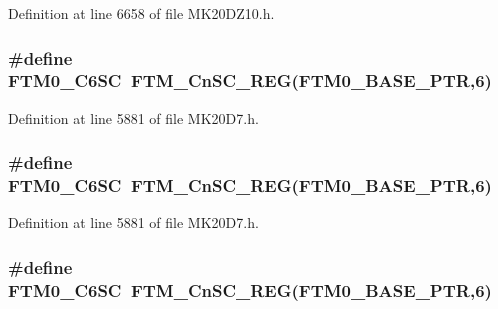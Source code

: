 Definition at line 6658 of file M\+K20\+D\+Z10.\+h.

\subsubsection[{\texorpdfstring{F\+T\+M0\+\_\+\+C6\+SC}{FTM0_C6SC}}]{\setlength{\rightskip}{0pt plus 5cm}\#define F\+T\+M0\+\_\+\+C6\+SC~{\bf F\+T\+M\+\_\+\+Cn\+S\+C\+\_\+\+R\+EG}({\bf F\+T\+M0\+\_\+\+B\+A\+S\+E\+\_\+\+P\+TR},6)}\hypertarget{group___f_t_m___register___accessor___macros_ga3396f58b1f7cc31a13bdee45a2ae783b}{}\label{group___f_t_m___register___accessor___macros_ga3396f58b1f7cc31a13bdee45a2ae783b}


Definition at line 5881 of file M\+K20\+D7.\+h.

\subsubsection[{\texorpdfstring{F\+T\+M0\+\_\+\+C6\+SC}{FTM0_C6SC}}]{\setlength{\rightskip}{0pt plus 5cm}\#define F\+T\+M0\+\_\+\+C6\+SC~{\bf F\+T\+M\+\_\+\+Cn\+S\+C\+\_\+\+R\+EG}({\bf F\+T\+M0\+\_\+\+B\+A\+S\+E\+\_\+\+P\+TR},6)}\hypertarget{group___f_t_m___register___accessor___macros_ga3396f58b1f7cc31a13bdee45a2ae783b}{}\label{group___f_t_m___register___accessor___macros_ga3396f58b1f7cc31a13bdee45a2ae783b}


Definition at line 5881 of file M\+K20\+D7.\+h.

\subsubsection[{\texorpdfstring{F\+T\+M0\+\_\+\+C6\+SC}{FTM0_C6SC}}]{\setlength{\rightskip}{0pt plus 5cm}\#define F\+T\+M0\+\_\+\+C6\+SC~{\bf F\+T\+M\+\_\+\+Cn\+S\+C\+\_\+\+R\+EG}({\bf F\+T\+M0\+\_\+\+B\+A\+S\+E\+\_\+\+P\+TR},6)}\hypertarget{group___f_t_m___register___accessor___macros_ga3396f58b1f7cc31a13bdee45a2ae783b}{}\label{group___f_t_m___register___accessor___macros_ga3396f58b1f7cc31a13bdee45a2ae783b}


